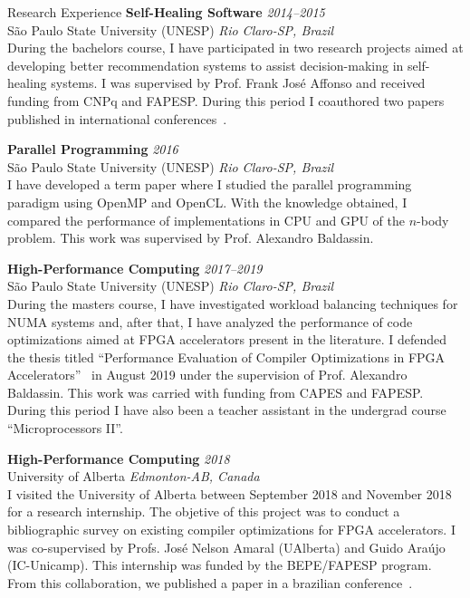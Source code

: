 \documentclass{resume}
\begin{document}
\begin{rSection}{Research Experience}
{\bf Self-Healing Software} \hfill {\em 2014--2015} \\
{\sc São Paulo State University (UNESP)} \hfill {\em Rio Claro-SP, Brazil} \\
During the bachelors course, I have participated in two research projects aimed
at developing better recommendation systems to assist decision-making in
self-healing systems. I was supervised by Prof. Frank José Affonso and received
funding from CNPq and FAPESP. During this period I coauthored two papers
published in international conferences~\cite{SEKE16,SEKE15}.

{\bf Parallel Programming} \hfill {\em 2016} \\
{\sc São Paulo State University (UNESP)} \hfill {\em Rio Claro-SP, Brazil} \\
I have developed a term paper where I studied the parallel programming paradigm
using OpenMP and OpenCL. With the knowledge obtained, I compared the performance
of implementations in CPU and GPU of the $n$-body problem. This work
was supervised by Prof. Alexandro Baldassin.

{\bf High-Performance Computing} \hfill {\em 2017--2019} \\
{\sc São Paulo State University (UNESP)} \hfill {\em Rio Claro-SP, Brazil} \\
During the masters course, I have investigated workload balancing techniques for
NUMA systems and, after that, I have analyzed the performance of code
optimizations aimed at FPGA accelerators present in the literature. I defended
the thesis titled ``Performance Evaluation of Compiler Optimizations in FPGA
Accelerators''~\cite{Master19} in August 2019 under the supervision of Prof.
Alexandro Baldassin. This work was carried with funding from CAPES and FAPESP.
During this period I have also been a teacher assistant in the undergrad course
``Microprocessors II''.

{\bf High-Performance Computing} \hfill {\em 2018} \\
{\sc University of Alberta} \hfill {\em Edmonton-AB, Canada} \\
I visited the University of Alberta between September 2018 and November 2018 for
a research internship.  The objetive of this project was to conduct a
bibliographic survey on existing compiler optimizations for FPGA accelerators. I
was co-supervised by Profs. José Nelson Amaral (UAlberta) and Guido Araújo
(IC-Unicamp). This internship was funded by the BEPE/FAPESP program. From this
collaboration, we published a paper in a brazilian conference~\cite{WSCAD19}.


\end{rSection}
\end{document}
